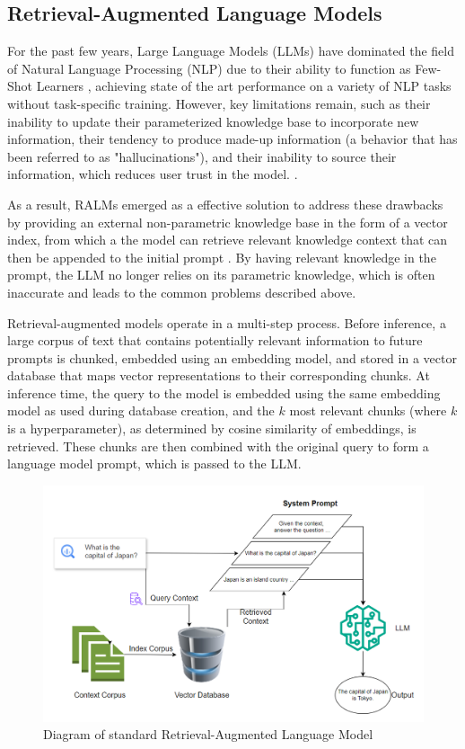 \documentclass[11pt]{article}
\begin{document}
\subsection{Retrieval-Augmented Language Models}
For the past few years, Large Language Models (LLMs) have dominated the field of Natural Language Processing (NLP) due to their ability to function as Few-Shot Learners \cite{brown2020language}, achieving state of the art performance on a variety of NLP tasks without task-specific training. However, key limitations remain, such as their inability to update their parameterized knowledge base to incorporate new information, their tendency to produce made-up information (a behavior that has been referred to as "hallucinations"), and their inability to source their information, which reduces user trust in the model. \cite{lewis2021retrievalaugmented, huang2023survey}. 

As a result, RALMs emerged as a effective solution to address these drawbacks by providing an external non-parametric knowledge base in the form of a vector index, from which a the model can retrieve relevant knowledge context that can then be appended to the initial prompt \cite{lewis2021retrievalaugmented}. By having relevant knowledge in the prompt, the LLM no longer relies on its parametric knowledge, which is often inaccurate and leads to the common problems described above.

Retrieval-augmented models operate in a multi-step process. Before inference, a large corpus of text that contains potentially relevant information to future prompts is chunked, embedded using an embedding model, and stored in a vector database that maps vector representations to their corresponding chunks. At inference time, the query to the model is embedded using the same embedding model as used during database creation, and the $k$ most relevant chunks (where $k$ is a hyperparameter), as determined by cosine similarity of embeddings, is retrieved. These chunks are then combined with the original query to form a language model prompt, which is passed to the LLM. 

\begin{figure}[t]
    \centering
    \includegraphics[width=1\linewidth]{overleaf/figs/rag_diagram.png}
    \caption{Diagram of standard Retrieval-Augmented Language Model}
    \label{fig:enter-label}
\end{figure}
\end{document}
